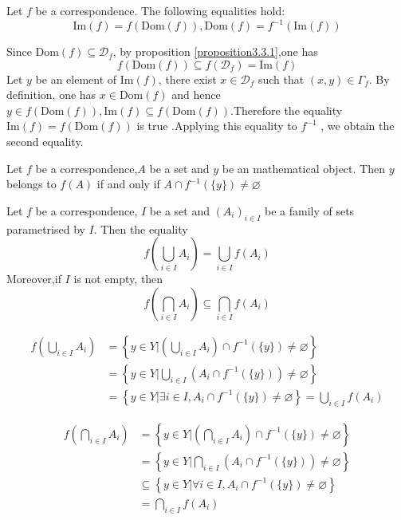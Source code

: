 \documentclass{book}
\numberwithin{equation}{section}
\begin{document}
\begin{propositionenv}\label{proposition3.3.2}
    Let $f$ be a correspondence. The following equalities hold:
    $$\mathrm{Im}(f)=f(\mathrm{Dom}(f)),\mathrm{Dom}(f)=f^{-1}(\mathrm{Im}(f))$$
\end{propositionenv}
\begin{proofenv}
    Since $\mathrm{Dom}(f)\subseteq\mathscr{D}_f$, by proposition \ref{proposition3.3.1},one has 
    $$f(\mathrm{Dom}(f))\subseteq f(\mathscr{D}_f)=\mathrm{Im}(f)$$
    Let $y$ be an element of $\mathrm{Im}(f)$, there exist $x\in \mathscr{D}_f$ such that $(x,y)\in \Gamma_f$. By definition, one has $x\in \mathrm{Dom }(f)$ and hence $y\in f(\mathrm{Dom }(f)),\mathrm{Im}(f)\subseteq f(\mathrm{Dom }(f))$.Therefore the equality $\mathrm{Im}(f)=f(\mathrm{Dom}(f))$ is true .Applying this equality to $f^{-1}$ , we obtain the second equality.
\end{proofenv}
\begin{propositionenv}
    Let $f$ be a correspondence,$A$ be a set and $y$ be an mathematical object. Then $y $ belongs to $f(A)$ if and only if $A\cap f^{-1}(\{y\})\not=\varnothing$
\end{propositionenv}
\begin{propositionenv}\label{proposition3.3.4}
    Let $f$ be a correspondence, $I$ be a set and $(A_i)_{i\in I}$ be a family of sets parametrised by $I$. Then the equality
    $$f\left( \bigcup_{i\in I}A_i\right)=\bigcup_{i\in I}f(A_i)$$
    Moreover,if $I$ is not empty, then 
    $$f\left( \bigcap_{i\in I}A_i\right)\subseteq \bigcap_{i\in I}f(A_i)$$

\end{propositionenv}
\begin{proofenv}
   \begin{align*}
         f\left( \bigcup_{i\in I}A_i\right)&=\left\{ y\in Y|\left( \bigcup_{i\in I}A_i\right)\cap f^{-1}(\{y\})\not=\varnothing  \right\}\\
        &=\left\{ y\in Y|\bigcup_{i\in I}\left(A_i\cap f^{-1}(\{y\})\right)\not=\varnothing  \right\}\\
        &=\left\{y\in Y|\exists i \in I,A_i\cap f^{-1}(\{y\})\not =\varnothing\right\}=\bigcup_{i\in I}f(A_i)
   \end{align*}

    \begin{align*}
        f\left(\bigcap_{i\in I}A_i \right)&=\left\{ y\in Y|\left( \bigcap_{i\in I}A_i\right) \cap f^{-1}(\{y\})\not=\varnothing\right\}\\
        &=\left\{ y\in Y| \bigcap_{i\in I}\left(A_i \cap f^{-1}(\{y\})\right)\not=\varnothing\right\}\\
        &\subseteq \left\{  y\in Y|\forall i\in I, A_i\cap f^{-1}(\{y\})\not=\varnothing\right\}\\
        &=\bigcap_{i\in I}f(A_i)
    \end{align*}
\end{proofenv}
\end{document}
